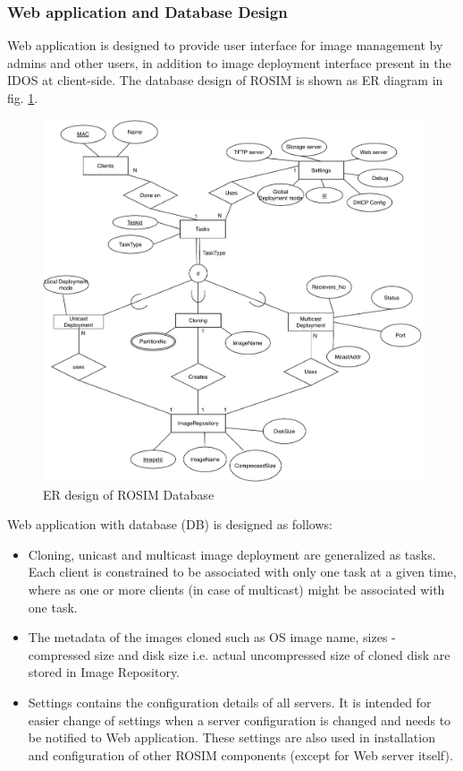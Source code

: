 \documentclass[a4paper,12pt]{article}
\begin{document}
\subsubsection{ Web application and Database Design}
Web application is designed to provide user interface for image management by admins and other users, in addition to image deployment interface present in the IDOS at client-side. The database design of ROSIM is shown as ER diagram in fig. \ref{DB}. 
\begin{figure}[]
    \centering
    \includegraphics[width=\linewidth]{DB.pdf}
    \caption{ER design of ROSIM Database}
    \label{DB}
\end{figure}
Web application with database (DB) is designed as follows:
\begin{itemize}
    \item Cloning, unicast and multicast image deployment are generalized as tasks. Each client is constrained to be associated with only one task at a given time, where as one or more clients (in case of multicast) might be  associated with one task.
    \item The metadata of the images cloned such as OS image name, sizes - compressed size and disk size i.e. actual uncompressed size of cloned disk are stored in Image Repository.
    \item Settings contains the configuration details of all servers. It is intended for easier change of settings when a server configuration is changed and needs to be notified to Web application. These settings are also used in installation and configuration of other ROSIM components (except for Web server itself).
\end{itemize}
\end{document}
